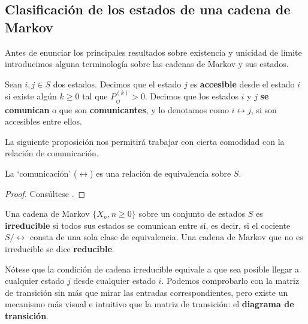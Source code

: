 \subsection{Clasificación de los estados de una cadena de Markov}

Antes de enunciar los principales resultados sobre existencia y unicidad de límite introducimos alguna terminología sobre las cadenas de Markov y sus estados.

\begin{definicion}
    Sean $i,j\in S$ dos estados. Decimos que el estado $j$ es \textbf{accesible} desde el estado $i$ si existe algún $k\geq 0$ tal que $P_{ij}^{(k)}>0$. Decimos que los estados $i$ y $j$ \textbf{se comunican} o que son  \textbf{comunicantes}, y lo denotamos como $i\leftrightarrow j$, si son accesibles entre ellos.
\end{definicion}

La siguiente proposición nos permitirá trabajar con cierta comodidad con la relación de comunicación.

\begin{proposicion}
    La `comunicación' ($\leftrightarrow$) es una relación de equivalencia sobre $S$.
\end{proposicion}
\begin{proof}
    Consúltese \cite[Proposition 4.2.1]{Ross}.
\end{proof}

\begin{definicion}
    Una cadena de Markov $\{X_n,n\geq 0\}$ sobre un conjunto de estados $S$ es \textbf{irreducible} si todos sus estados se comunican entre sí, es decir, si el cociente $S/\leftrightarrow$ consta de una sola clase de equivalencia. Una cadena de Markov que no es irreducible se dice \textbf{reducible}.
\end{definicion}

Nótese que la condición de cadena irreducible equivale a que sea posible llegar a cualquier estado $j$ desde cualquier estado $i$. Podemos comprobarlo con la matriz de transición sin más que mirar las entradas correspondientes, pero existe un mecanismo más visual e intuitivo que la matriz de transición: el \textbf{diagrama de transición}.

